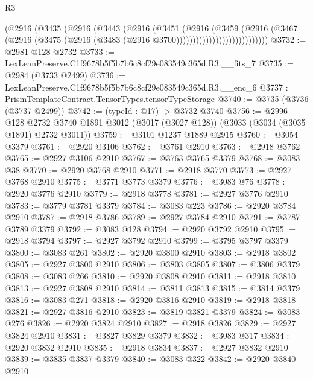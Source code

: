 \begin{lexlean}{R3}
\begin{coremodule}
                              (@2916
                                (@3435
                                  (@2916
                                    (@3443
                                      (@2916
                                        (@3451
                                          (@2916
                                            (@3459
                                              (@2916
                                                (@3467
                                                  (@2916
                                                    (@3475
                                                      (@2916
                                                        (@3483
                                                          (@2916 @3700))))))))))))))))))))))))))))
@3732 := @2981 @128 @2732
@3733 := LexLeanPreserve.C1f9678b5f5b7b6c8cf29e083549c365d.R3.__fits_7
@3735 := @2984 (@3733 @2499)
@3736 := LexLeanPreserve.C1f9678b5f5b7b6c8cf29e083549c365d.R3.__enc_6
@3737 := PrismTemplateContract.TensorTypes.tensorTypeStorage
@3740 := @3735 (@3736 (@3737 @2499))
@3742 := (typeId : @17) -> @3732 @3740
@3756 := @2996
    @128
    @2732
    @3740
    @1891
    @3012
    (@3017 (@3027 @128))
    (@3033 (@3034 (@3035 @1891) @2732 @3011))
@3759 := @3101 @1237 @1889 @2915
@3760 := @3054 @3379
@3761 := @2920 @3106
@3762 := @3761 @2910
@3763 := @2918 @3762
@3765 := @2927 @3106 @2910
@3767 := @3763 @3765 @3379
@3768 := @3083 @38
@3770 := @2920 @3768 @2910
@3771 := @2918 @3770
@3773 := @2927 @3768 @2910
@3775 := @3771 @3773 @3379
@3776 := @3083 @76
@3778 := @2920 @3776 @2910
@3779 := @2918 @3778
@3781 := @2927 @3776 @2910
@3783 := @3779 @3781 @3379
@3784 := @3083 @223
@3786 := @2920 @3784 @2910
@3787 := @2918 @3786
@3789 := @2927 @3784 @2910
@3791 := @3787 @3789 @3379
@3792 := @3083 @128
@3794 := @2920 @3792 @2910
@3795 := @2918 @3794
@3797 := @2927 @3792 @2910
@3799 := @3795 @3797 @3379
@3800 := @3083 @261
@3802 := @2920 @3800 @2910
@3803 := @2918 @3802
@3805 := @2927 @3800 @2910
@3806 := @3803 @3805
@3807 := @3806 @3379
@3808 := @3083 @266
@3810 := @2920 @3808 @2910
@3811 := @2918 @3810
@3813 := @2927 @3808 @2910
@3814 := @3811 @3813
@3815 := @3814 @3379
@3816 := @3083 @271
@3818 := @2920 @3816 @2910
@3819 := @2918 @3818
@3821 := @2927 @3816 @2910
@3823 := @3819 @3821 @3379
@3824 := @3083 @276
@3826 := @2920 @3824 @2910
@3827 := @2918 @3826
@3829 := @2927 @3824 @2910
@3831 := @3827 @3829 @3379
@3832 := @3083 @317
@3834 := @2920 @3832 @2910
@3835 := @2918 @3834
@3837 := @2927 @3832 @2910
@3839 := @3835 @3837 @3379
@3840 := @3083 @322
@3842 := @2920 @3840 @2910

\end{coremodule}
\end{lexlean}
